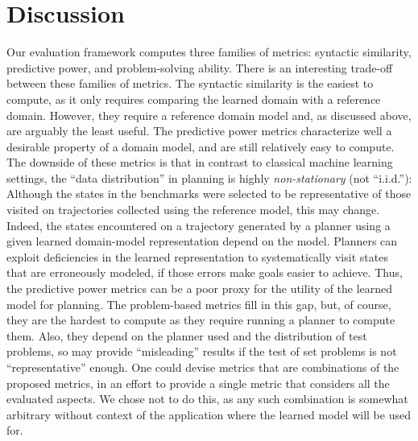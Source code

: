 \documentclass[letterpaper]{article} %
\newif\ifaddcomments
\newcommand{\roni}[1]{\ifaddcomments{\textcolor{red}{[Roni: #1]}}\fi}
\newcommand{\leo}[1]{\ifaddcomments{\textcolor{pink}{[Leonardo: #1]}}\fi}
\begin{document}
\section{Discussion}
Our evaluation framework computes three families of metrics: syntactic similarity, predictive power, and problem-solving ability. 
There is an interesting trade-off between these families of metrics. 
The syntactic similarity is the easiest to compute, as it only requires comparing the learned domain with a reference domain. However, they require a reference domain model and, as discussed above, are arguably the least useful. 
The predictive power metrics characterize well a desirable property of a domain model, and are still relatively easy to compute. 
The downside of these metrics is that in contrast to classical machine learning settings, the ``data distribution'' in planning is highly \emph{non-stationary} (not ``i.i.d.''):  Although the states in the benchmarks were selected to be representative of those visited on trajectories collected using the reference model, this may change. Indeed, the states encountered on a trajectory generated by a planner using a given learned domain-model representation depend on the model. Planners can exploit deficiencies in the learned representation to systematically visit states that are erroneously modeled, if those errors make goals easier to achieve. Thus, the predictive power metrics can be a poor proxy for the utility of the learned model for planning. The problem-based metrics fill in this gap, but, of course, they are the hardest to compute as they require running a planner to compute them. Also, they depend on the planner used and the distribution of test problems, so may provide ``misleading'' results if the test of set problems is not ``representative'' enough.  
One could devise metrics that are combinations of the proposed metrics, in an effort to provide a single metric that considers all the evaluated aspects. We chose not to do this, as any such combination is somewhat arbitrary without context of the application where the learned model will be used for. 
\roni{Added above 2 sentences for AAAI reviewer}


%
\end{document}
